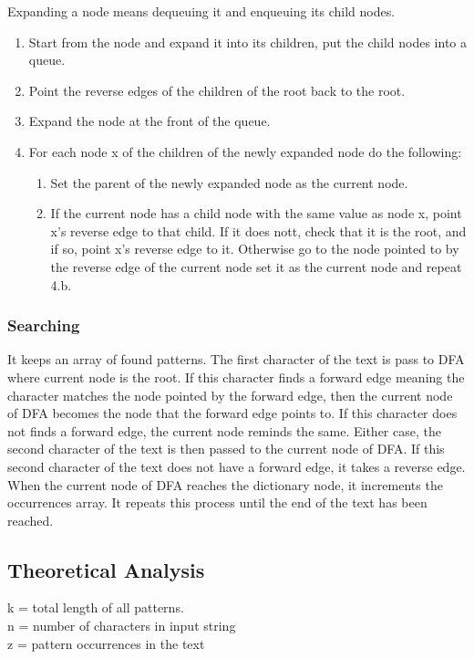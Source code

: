 \documentclass[paper=a4, fontsize=11pt]{scrartcl} %
\numberwithin{equation}{section} %
\numberwithin{figure}{section} %
\numberwithin{table}{section} %
\begin{document}
Expanding a node means dequeuing it and enqueuing its child nodes.
\begin{enumerate}
\item Start from the node and expand it into its children, put the child nodes into a queue.

\item Point the reverse edges of the children of the root back to the root.

\item Expand the node at the front of the queue.

\item For each node x of the children of the newly expanded node do the following:

\begin{enumerate}
        \item Set the parent of the newly expanded node as the current node.

        \item If the current node has a child node with the same value as node x, point x's reverse edge to that child. If it does nott, check that it is the root, and if so, point x's reverse edge to it. Otherwise go to the node pointed to by the reverse edge of the current node set it as the current node and repeat 4.b.
\end{enumerate}
\end{enumerate}

\subsubsection{Searching}
It keeps an array of found patterns. The first character of the text is pass to DFA where current node is the root. If this character finds a forward edge meaning the character matches the node pointed by the forward edge, then the current node of DFA becomes the node that the forward edge points to. If this character does not finds a forward edge, the current node reminds the same. Either case, the second character of the text is then passed to the current node of DFA. If this second character of the text does not have a forward edge, it takes a reverse edge. When the current node of DFA reaches the dictionary node, it increments the occurrences array. It repeats this process until the end of the text has been reached.

\subsection{Theoretical Analysis}
k = total length of all patterns.\\
n = number of characters in input string\\
z = pattern occurrences in the text\\
\end{document}
